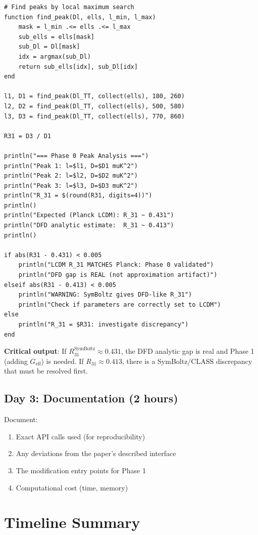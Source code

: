 \documentclass[11pt,a4paper]{article}
\begin{document}
\begin{lstlisting}[caption={Extract peak ratio $R_{31}$}]
# Find peaks by local maximum search
function find_peak(Dl, ells, l_min, l_max)
    mask = l_min .<= ells .<= l_max
    sub_ells = ells[mask]
    sub_Dl = Dl[mask]
    idx = argmax(sub_Dl)
    return sub_ells[idx], sub_Dl[idx]
end

l1, D1 = find_peak(Dl_TT, collect(ells), 180, 260)
l2, D2 = find_peak(Dl_TT, collect(ells), 500, 580)
l3, D3 = find_peak(Dl_TT, collect(ells), 770, 860)

R31 = D3 / D1

println("=== Phase 0 Peak Analysis ===")
println("Peak 1: l=$l1, D=$D1 muK^2")
println("Peak 2: l=$l2, D=$D2 muK^2")
println("Peak 3: l=$l3, D=$D3 muK^2")
println("R_31 = $(round(R31, digits=4))")
println()
println("Expected (Planck LCDM): R_31 ~ 0.431")
println("DFD analytic estimate:  R_31 ~ 0.413")
println()

if abs(R31 - 0.431) < 0.005
    println("LCDM R_31 MATCHES Planck: Phase 0 validated")
    println("DFD gap is REAL (not approximation artifact)")
elseif abs(R31 - 0.413) < 0.005
    println("WARNING: SymBoltz gives DFD-like R_31")
    println("Check if parameters are correctly set to LCDM")
else
    println("R_31 = $R31: investigate discrepancy")
end
\end{lstlisting}

\textbf{Critical output}: If $R_{31}^{\mathrm{SymBoltz}} \approx 0.431$, the DFD analytic gap is real and Phase 1 (adding $G_{\mathrm{eff}}$) is needed. If $R_{31} \approx 0.413$, there is a SymBoltz/CLASS discrepancy that must be resolved first.

\subsection{Day 3: Documentation (2 hours)}

Document:
\begin{enumerate}
\item Exact API calls used (for reproducibility)
\item Any deviations from the paper's described interface
\item The modification entry points for Phase 1
\item Computational cost (time, memory)
\end{enumerate}

\section{Timeline Summary}
\end{document}
